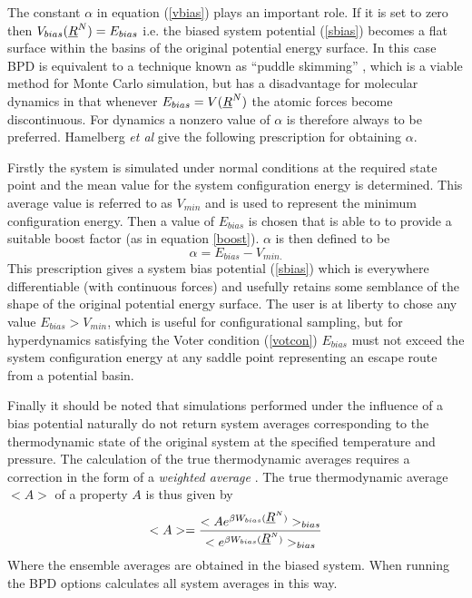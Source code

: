 The constant $\alpha$ in equation (\ref{vbias}) plays an important role. If it
is set to zero then $V_{bias}(\mbox{$\underline{R}$}^{N})=E_{bias}$ i.e. the biased system
potential (\ref{sbias}) becomes a flat surface within the basins of the
original potential energy surface. In this case BPD is equivalent to a
technique known as ``puddle skimming'' \cite{rahman-02a}, which is a viable
method for Monte Carlo simulation, but has a disadvantage for molecular
dynamics in that whenever $E_{bias}=V(\mbox{$\underline{R}$}^{N})$ the atomic forces become
discontinuous. For dynamics a nonzero value of $\alpha$ is therefore always to
be preferred. Hamelberg {\em et al} \cite{hamelberg-04a} give the following
prescription for obtaining $\alpha$.

Firstly the system is simulated under normal conditions at the
required state point and the mean value for the system configuration
energy is determined. This average value is referred to as $V_{min}$
and is used to represent the minimum configuration energy. Then a
value of $E_{bias}$ is chosen that is able to to provide a suitable
boost factor (as in equation \ref{boost}). $\alpha$ is then defined to
be
\begin{equation}
\alpha=E_{bias}-V_{min.}
\end{equation} 
This prescription gives a system bias potential (\ref{sbias}) which is
everywhere differentiable (with continuous forces) and usefully
retains some semblance of the shape of the original potential energy
surface. The user is at liberty to chose any value
$E_{bias}>V_{min}$, which is useful for configurational
sampling, but for hyperdynamics satisfying the Voter condition
(\ref{votcon}) $E_{bias}$ must not exceed the system configuration
energy at any saddle point representing an escape route from a
potential basin.

Finally it should be noted that simulations performed under the
influence of a bias potential naturally do not return system averages
corresponding to the thermodynamic state of the original system
at the specified temperature and pressure. The calculation of the true
thermodynamic averages requires a correction in the form of a {\em
weighted average} \cite{hamelberg-04a}. The true thermodynamic average
$<A>$ of a property $A$ is thus given by
\begin{equation}
<A>=\frac{<Ae^{\beta W_{bias}(\mbox{$\underline{R}$}^{N})}>_{bias}}
{<e^{\beta W_{bias}(\mbox{$\underline{R}$}^{N})}>_{bias}} \label{cbias}
\end{equation}
Where the ensemble averages are obtained in the biased system.  When
running the BPD options \D{} calculates all system averages in this way.

